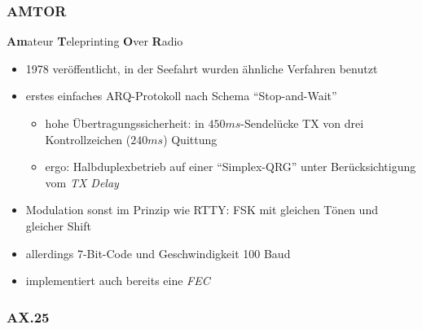 \begin{frame}
  \frametitle{AMTOR}

  \textbf{Am}ateur \textbf{T}eleprinting \textbf{O}ver \textbf{R}adio

  \begin{itemize}
    \item 1978 veröffentlicht, in der Seefahrt wurden ähnliche Verfahren benutzt
    \item erstes einfaches ARQ-Protokoll nach Schema ``Stop-and-Wait''
      \begin{itemize}
        \item hohe Übertragungssicherheit: in $450ms$-Sendelücke TX von drei
          Kontrollzeichen ($240ms$) Quittung
        \item ergo: Halbduplexbetrieb auf einer ``Simplex-QRG'' unter
          Berücksichtigung vom \emph{TX Delay}
      \end{itemize}
    \item Modulation sonst im Prinzip wie RTTY: FSK mit gleichen Tönen und gleicher Shift
    \item allerdings 7-Bit-Code und Geschwindigkeit 100 Baud
    \item implementiert auch bereits eine \emph{FEC}
  \end{itemize}

\end{frame}

\subsubsection{AX.25}

